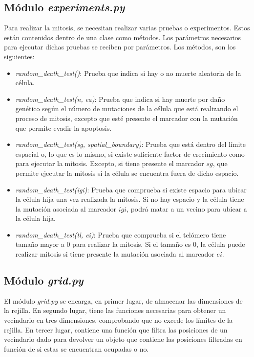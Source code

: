 \subsection{Módulo \textit{experiments.py}}

Para realizar la mitosis, se necesitan realizar varias pruebas o experimentos. Estos
están contenidos dentro de una clase como métodos. Los parámetros necesarios para ejecutar dichas
pruebas se reciben por parámetros. Los métodos, son los siguientes:

\begin{itemize}
  \item \textit{random\_death\_test()}: Prueba que indica si hay o no muerte aleatoria de la célula.
  \item \textit{random\_death\_test(n, ea)}: Prueba que indica si hay muerte por daño genético según
  el número de mutaciones de la célula que está realizando el proceso de mitosis, excepto que esté
  presente el marcador con la mutación que permite evadir la apoptosis.
  \item \textit{random\_death\_test(sg, spatial\_boundary)}: Prueba que está dentro del
  límite espacial o, lo que es lo mismo, si existe suficiente factor de crecimiento como
  para ejecutar la mitosis. Excepto, si tiene presente el marcador $sg$, que permite
  ejecutar la mitosis si la célula se encuentra fuera de dicho espacio.
  \item \textit{random\_death\_test(igi)}: Prueba que comprueba si existe espacio para ubicar la célula
  hija una vez realizada la mitosis. Si no hay espacio y la célula tiene la mutación asociada al
  marcador $igi$, podrá matar a un vecino para ubicar a la célula hija.
  \item \textit{random\_death\_test(tl, ei)}: Prueba que comprueba si el telómero tiene tamaño
  mayor a $0$ para realizar la mitosis. Si el tamaño es $0$, la célula puede realizar mitosis
  si tiene presente la mutación asociada al marcador $ei$.
\end{itemize}

\subsection{Módulo \textit{grid.py}}

El módulo \textit{grid.py} se encarga, en primer lugar, de almacenar las dimensiones de la
rejilla. En segundo lugar, tiene las funciones necesarias para obtener un vecindario en
tres dimensiones, comprobando que no excede los límites de la rejilla. En tercer lugar, contiene
una función que filtra las posiciones de un vecindario dado para devolver un objeto que contiene
las posiciones filtradas en función de si estas se encuentran ocupadas o no.

